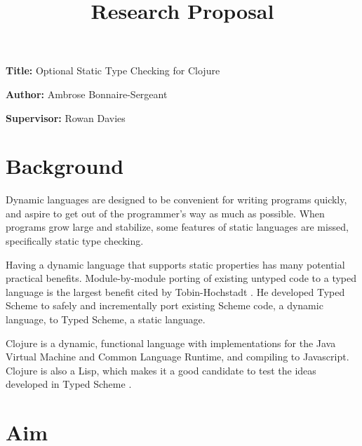 \documentclass[12pt, a4paper]{article}
\title{Research Proposal}
\author{}
\date{}
\newcommand{\namelistlabel}[1]{\mbox{#1}\hfil}
\newenvironment{namelist}[1]{%
\begin{list}{}
    {
        \let\makelabel\namelistlabel
        \settowidth{\labelwidth}{#1}
        \setlength{\leftmargin}{1.1\labelwidth}
    }
  }{%
\end{list}}
\begin{document}
\maketitle

\begin{namelist}{xxxxxxxxxxxx}
\item[{\bf Title:}]
	Optional Static Type Checking for Clojure
\item[{\bf Author:}]
	Ambrose Bonnaire-Sergeant
\item[{\bf Supervisor:}]
	Rowan Davies
\end{namelist}

\section*{Background} 


Dynamic languages are designed to be convenient for
writing programs quickly, and aspire to get out of the programmer's
way as much as possible. When programs grow large and stabilize,
some features of static languages are missed, specifically static
type checking. 

Having a dynamic language that supports static properties 
has many potential practical benefits. 
Module-by-module porting of existing untyped code to a typed language 
is the largest benefit cited by Tobin-Hochstadt \cite{TypedScheme:2010}.
He developed Typed Scheme
\cite{TypedScheme:2010} 
to safely and incrementally port existing Scheme code, a dynamic language, to
Typed Scheme, a static language.

Clojure is a dynamic, functional language with implementations for the Java Virtual
Machine and Common Language Runtime, and compiling to Javascript. Clojure
is also a Lisp, which makes it a good candidate to test the ideas developed in
Typed Scheme \cite{TypedScheme:2010}.

\section*{Aim} 

\end{document}
